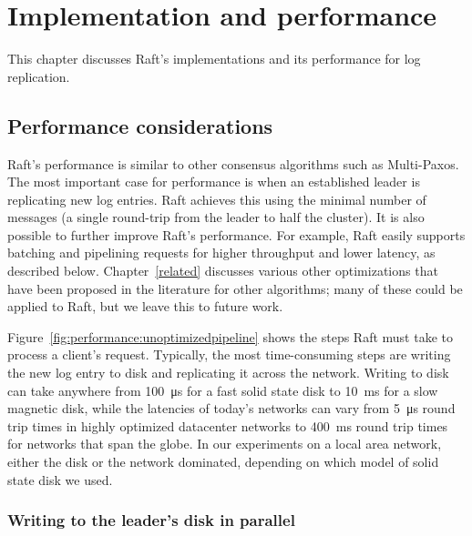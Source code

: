 \chapter{Implementation and performance}
\label{performance}

This chapter discusses Raft's implementations and its performance for log
replication.



\section{Performance considerations}

Raft's performance is similar to other consensus algorithms such as
Multi-Paxos. The most important case for performance is when an
established leader is replicating new log entries. Raft achieves this
using the minimal number of messages (a single round-trip from the
leader to half the cluster). It is also possible to further improve
Raft's performance. For example, Raft easily supports batching and
pipelining requests for higher throughput and lower latency, as
described below. Chapter~\ref{related} discusses various other
optimizations that have been proposed in the literature for other
algorithms; many of these could be applied to Raft, but we leave this to
future work.

Figure~\ref{fig:performance:unoptimizedpipeline} shows the steps Raft
must take to process a client's request. Typically, the most
time-consuming steps are writing the new log entry to disk and
replicating it across the network. Writing to disk can take anywhere
from \SI{100}{\micro\second} for a fast solid state disk to
\SI{10}{\milli\second} for
a slow magnetic disk, while the latencies of today's networks can vary
from \SI{5}{\micro\second} round trip times in highly optimized datacenter
networks to \SI{400}{\milli\second} round trip times for networks that span the
globe. In our experiments on a local area network, either the disk or
the network dominated, depending on which model of solid state disk we
used.

\subsection{Writing to the leader's disk in parallel}
\label{performance:leaderdisk}

